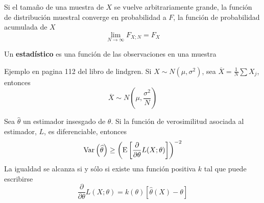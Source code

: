 \begin{proposicion}
Si el tamaño de una muestra de $X$ se vuelve arbitrariamente grande, la función de distribución muestral converge en probabilidad a $F$, la función de probabilidad acumulada de $X$
\begin{equation}
\lim_{N \rightarrow \infty} F_{X; N} = F_X
\end{equation}
\end{proposicion}


\begin{definicion}
Un \textbf{estadístico} es una función de las observaciones en una muestra
\end{definicion}

Ejemplo en pagina 112 del libro de lindgren.
Si $X\sim N(\mu,\sigma^{2})$, sea $\overline{X} = \frac{1}{N} \sum X_j$, entonces
\begin{equation}
\overline{X} \sim N(\mu,\frac{\sigma^{2}}{N})
\end{equation}

\begin{teorema}
Sea $\widehat{\theta}$ un estimador insesgado de $\theta$. Si la función de verosimilitud asociada al estimador, $L$, es diferenciable, entonces
\begin{equation}
\mathrm{Var}\left( \widehat{\theta} \right) \geq \left( \mathrm{E}\left[ \frac{\partial}{\partial\theta} L(X; \theta) \right] \right)^{-2}
\end{equation}
La igualdad se alcanza si y sólo si existe una función positiva $k$ tal que puede escribirse
\begin{equation}
\frac{\partial}{\partial\theta} L(X; \theta) = k(\theta) \left[ \widehat{\theta}(X) - \theta \right] 
\end{equation}
\end{teorema}



